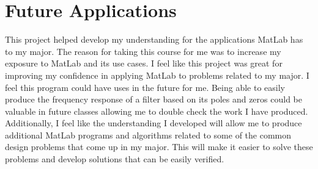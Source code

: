 \documentclass[a4paper]{article}
\begin{document}
\section{Future Applications}   
This project helped develop my understanding for the applications MatLab has to my major. The reason for taking this course for me was to increase my exposure to MatLab and its use cases. I feel like this project was great for improving my confidence in applying MatLab to problems related to my major. I feel this program could have uses in the future for me. Being able to easily produce the frequency response of a filter based on its poles and zeros could be valuable in future classes allowing me to double check the work I have produced. Additionally, I feel like the understanding I developed will allow me to produce additional MatLab programs and algorithms related to some of the common design problems that come up in my major. This will make it easier to solve these problems and develop solutions that can be easily verified.



\end{document}
